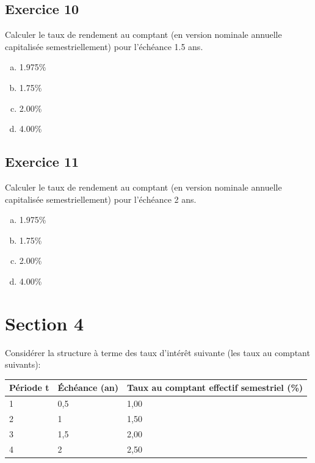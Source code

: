 \documentclass[10pt,a4paper]{article}
\begin{document}
\subsection*{Exercice 10}
Calculer le taux de rendement au comptant (en version nominale annuelle capitalisée semestriellement) pour l'échéance 1.5 ans.

\begin{enumerate}[a)]
\item 1.975\%
\item 1.75\%
\item 2.00\%
\item 4.00\%
\end{enumerate}


\subsection*{Exercice 11}
Calculer le taux de rendement au comptant (en version nominale annuelle capitalisée semestriellement) pour l'échéance 2 ans.

\begin{enumerate}[a)]
\item 1.975\%
\item 1.75\%
\item 2.00\%
\item 4.00\%
\end{enumerate}

\newpage

\section*{Section 4}
Considérer la structure à terme des taux d'intérêt suivante (les taux au comptant suivants):

\begin{table}[H]
\begin{center}
\begin{tabular}{|l|l|l|}
\hline
Période t & Échéance (an) & Taux au comptant effectif semestriel (\%) \\ \hline
1         & 0,5           & 1,00                                      \\ \hline
2         & 1             & 1,50                                      \\ \hline
3         & 1,5           & 2,00                                      \\ \hline
4         & 2             & 2,50                                      \\ \hline
\end{tabular}
\end{center}
\end{table}
\end{document}
